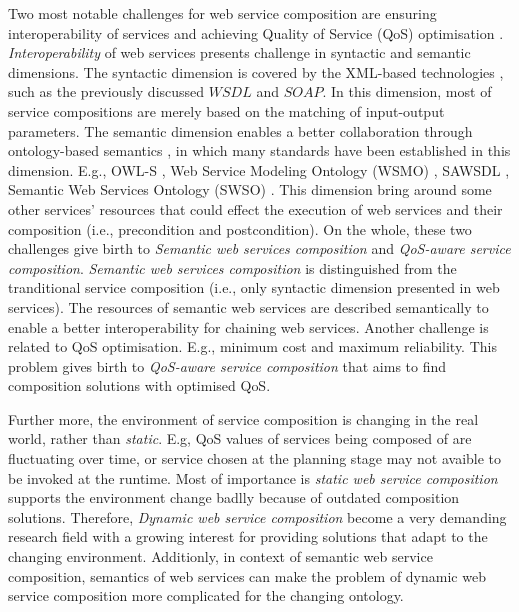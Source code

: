 Two most notable challenges for web service composition are ensuring interoperability of services and achieving Quality of Service (QoS) optimisation \cite{fensel2011semantic}. \emph{Interoperability} of web services presents challenge in syntactic and semantic dimensions. The syntactic dimension is covered by the XML-based technologies \cite{yu2008deploying}, such as the previously discussed $WSDL$ and $SOAP$. In this dimension, most of service compositions are merely based on the matching of input-output parameters. The semantic dimension enables a better collaboration through ontology-based semantics \cite{o2005review}, in which many standards have been established in this dimension. E.g., OWL-S \cite{martin2004owl}, Web Service Modeling Ontology (WSMO) \cite{lausen2005w3c}, SAWSDL \cite{kopecky2007sawsdl}, Semantic Web Services Ontology (SWSO) \cite{petrie2016web}. This dimension bring around some other services' resources that could effect the execution of web services and their composition (i.e., precondition and postcondition). On the whole, these two challenges give birth to \emph{Semantic web services composition} and \emph{QoS-aware service composition}. \emph{Semantic web services composition} is distinguished from the tranditional service composition (i.e., only syntactic dimension presented in web services). The resources of semantic web services are described semantically to enable a better interoperability for chaining web services. Another challenge is related to QoS optimisation. E.g., minimum cost and maximum reliability. This problem gives birth to \emph{QoS-aware service composition} that aims to find composition solutions with optimised QoS. 

Further more, the environment of service composition is changing in the real world, rather than \emph{static}. E.g, QoS values of services being composed of are fluctuating over time, or service chosen at the planning stage may not avaible to be invoked at the runtime. Most of importance is \emph{static web service composition} supports the environment change badlly because of outdated composition solutions. Therefore, \emph{Dynamic web service composition} become a very demanding research field with a growing interest for providing solutions that adapt to the changing environment. Additionly, in context of semantic web service composition, semantics of web services can make the problem of dynamic web service composition more complicated for the changing ontology.



